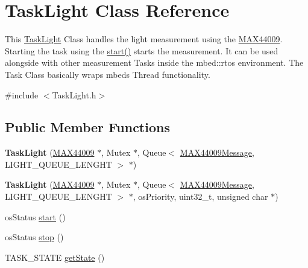 \hypertarget{class_task_light}{}\section{Task\+Light Class Reference}
\label{class_task_light}


This \hyperlink{class_task_light}{Task\+Light} Class handles the light measurement using the \hyperlink{class_m_a_x44009}{M\+A\+X44009}. Starting the task using the \hyperlink{class_task_light_a958f0696792985292633cd57e95b95f6}{start()} starts the measurement. It can be used alongside with other measurement Tasks inside the mbed\+::rtos environment. The Task Class basically wraps mbeds Thread functionality.  




{\ttfamily \#include $<$Task\+Light.\+h$>$}

\subsection*{Public Member Functions}
\begin{DoxyCompactItemize}
\item 
\hypertarget{class_task_light_a7d0fa8fa8313080e5c539bde177343f9}{}{\bfseries Task\+Light} (\hyperlink{class_m_a_x44009}{M\+A\+X44009} $\ast$, Mutex $\ast$, Queue$<$ \hyperlink{class_m_a_x44009_message}{M\+A\+X44009\+Message}, L\+I\+G\+H\+T\+\_\+\+Q\+U\+E\+U\+E\+\_\+\+L\+E\+N\+G\+H\+T $>$ $\ast$)\label{class_task_light_a7d0fa8fa8313080e5c539bde177343f9}

\item 
\hypertarget{class_task_light_ace733e8561a21d4e19b6420ab7b245f7}{}{\bfseries Task\+Light} (\hyperlink{class_m_a_x44009}{M\+A\+X44009} $\ast$, Mutex $\ast$, Queue$<$ \hyperlink{class_m_a_x44009_message}{M\+A\+X44009\+Message}, L\+I\+G\+H\+T\+\_\+\+Q\+U\+E\+U\+E\+\_\+\+L\+E\+N\+G\+H\+T $>$ $\ast$, os\+Priority, uint32\+\_\+t, unsigned char $\ast$)\label{class_task_light_ace733e8561a21d4e19b6420ab7b245f7}

\item 
os\+Status \hyperlink{class_task_light_a958f0696792985292633cd57e95b95f6}{start} ()
\item 
os\+Status \hyperlink{class_task_light_a0b14246106163f1e230d16d542f7698f}{stop} ()
\item 
T\+A\+S\+K\+\_\+\+S\+T\+A\+T\+E \hyperlink{class_task_light_ae8ef3f57c726cb99c5983270aedcfb82}{get\+State} ()
\end{DoxyCompactItemize}


